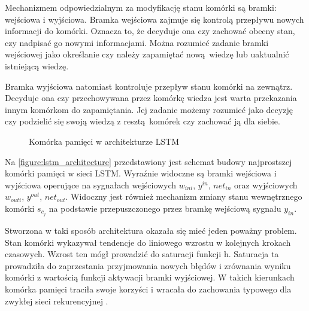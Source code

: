 \documentclass[10pt,a4paper]{article}
\begin{document}
Mechanizmem odpowiedzialnym za modyfikację stanu komórki są bramki: wejściowa i wyjściowa. Bramka wejściowa zajmuje się kontrolą przepływu nowych informacji do komórki. Oznacza to, że decyduje ona czy zachować obecny stan, czy nadpisać go nowymi informacjami. Można rozumieć zadanie bramki wejściowej jako określanie czy należy zapamiętać nową wiedzę lub uaktualnić istniejącą wiedzę. 

Bramka wyjściowa natomiast kontroluje przepływ stanu komórki na zewnątrz. Decyduje ona czy przechowywana przez komórkę wiedza jest warta przekazania innym komórkom do zapamiętania. Jej zadanie możemy rozumieć jako decyzję czy podzielić się swoją wiedzą z resztą komórek czy zachować ją dla siebie. 

\begin{figure}[!ht]
	\centering
	\caption{Komórka pamięci w architekturze LSTM}
	\label{figure:lstm_architecture}
\end{figure}
\FloatBarrier

Na \autoref{figure:lstm_architecture} przedstawiony jest schemat budowy najprostszej komórki pamięci w sieci LSTM. Wyraźnie widoczne są bramki wejściowa i wyjściowa operujące na sygnałach wejściowych $w_{ini}$, $y^{in}$, $net_{in}$ oraz wyjściowych ${w_{outi}}$, $y^{out}$, $net_{out}$. Widoczny jest również mechanizm zmiany stanu wewnętrznego komórki $s_{c_j}$ na podstawie przepuszczonego przez bramkę wejściową sygnału $y_{in}$.

Stworzona w taki sposób architektura okazała się mieć jeden poważny problem. Stan komórki wykazywał tendencje do liniowego wzrostu w kolejnych krokach czasowych. Wzrost ten mógł prowadzić do saturacji funkcji h. Saturacja ta prowadziła do zaprzestania przyjmowania nowych błędów i zrównania wyniku komórki z wartością funkcji aktywacji bramki wyjściowej. W takich kierunkach komórka pamięci traciła swoje korzyści i wracała do zachowania typowego dla zwykłej sieci rekurencyjnej \cite{gers2000learning}.
\end{document}
